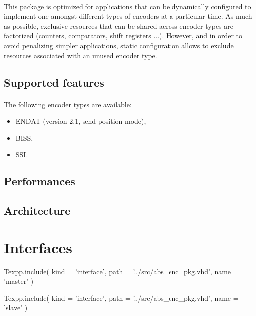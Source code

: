 \documentclass[12pt]{article}
\begin{document}
\paragraph{}
This package is optimized for applications that can be dynamically configured
to implement one amongst different types of encoders at a particular time. As
much as possible, exclusive resources that can be shared across encoder types
are factorized (counters, comparators, shift registers ...). However, and in
order to avoid penalizing simpler applications, static configuration allows to
exclude resources associated with an unused encoder type.


\subsection{Supported features}
\todo
\paragraph{}
The following encoder types are available:
\begin{itemize}
 \item ENDAT (version 2.1, send position mode),
 \item BISS,
 \item SSI.
\end{itemize}


\subsection{Performances}
\todo


\subsection{Architecture}
\todo



\newpage
\section{Interfaces}

\begin{texpp}
Texpp.include(
 kind = 'interface',
 path = '../src/abs_enc_pkg.vhd',
 name = 'master'
)
\end{texpp}

\begin{texpp}
Texpp.include(
 kind = 'interface',
 path = '../src/abs_enc_pkg.vhd',
 name = 'slave'
)
\end{texpp}
\end{document}
